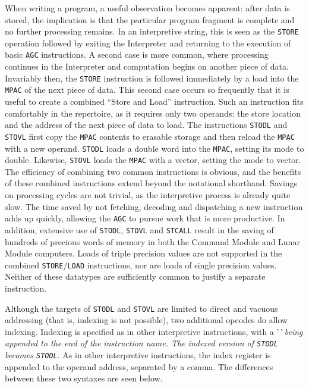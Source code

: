 \documentclass[refcap, oxford]{ahsan}
\begin{document}

When writing a program, a useful observation becomes apparent: after data is stored, the implication is that the particular program fragment is complete and no further processing remains. In an interpretive string, this is seen as the \texttt{STORE} operation followed by exiting the Interpreter and returning to the execution of basic \texttt{AGC} instructions. A second case is more common, where processing continues in the Interpreter and computation begins on another piece of data. Invariably then, the \texttt{STORE} instruction is followed immediately by a load into the \texttt{MPAC} of the next piece of data. This second case occurs so frequently that it is useful to create a combined ``Store and Load'' instruction. Such an instruction fits comfortably in the repertoire, as it requires only two operands: the store location and the address of the next piece of data to load. The instructions \texttt{STODL} and \texttt{STOVL} first copy the \texttt{MPAC} contents to erasable storage and then reload the \texttt{MPAC} with a new operand. \texttt{STODL} loads a double word into the \texttt{MPAC}, setting its mode to double. Likewise, \texttt{STOVL} loads the \texttt{MPAC} with a vector, setting the mode to vector. The efficiency of combining two common instructions is obvious, and the benefits of these combined instructions extend beyond the notational shorthand. Savings on processing cycles are not trivial, as the interpretive process is already quite slow. The time saved by not fetching, decoding and dispatching a new instruction adds up quickly, allowing the \texttt{AGC} to pursue work that is more productive. In addition, extensive use of \texttt{STODL}, \texttt{STOVL} and \texttt{STCALL} result in the saving of hundreds of precious words of memory in both the Command Module and Lunar Module computers. Loads of triple precision values are not supported in the combined \texttt{STORE}/\texttt{LOAD} instructions, nor are loads of single precision values. Neither of these datatypes are sufficiently common to justify a separate instruction.

Although the targets of \texttt{STODL} and \texttt{STOVL} are limited to direct and vacuous addressing (that is, indexing is not possible), two additional opcodes do allow indexing. Indexing is specified as in other interpretive instructions, with a '\textit{' being appended to the end of the instruction name. The indexed version of \texttt{STODL} becomes \texttt{STODL}}. As in other interpretive instructions, the index register is appended to the operand address, separated by a comma. The differences between these two syntaxes are seen below.
\end{document}

